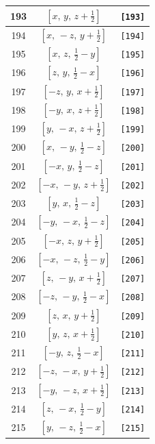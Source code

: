 \documentclass[fleqn,8pt]{jsarticle}
\begin{document}
\begin{longtable}{ccc}
193 & $\left[ x,\, y,\, z + \frac{1}{2} \right]$ & {\tt [193]} \\ \hline
194 & $\left[ x,\, - z,\, y + \frac{1}{2} \right]$ & {\tt [194]} \\ \hline
195 & $\left[ x,\, z,\, \frac{1}{2} - y \right]$ & {\tt [195]} \\ \hline
196 & $\left[ z,\, y,\, \frac{1}{2} - x \right]$ & {\tt [196]} \\ \hline
197 & $\left[ - z,\, y,\, x + \frac{1}{2} \right]$ & {\tt [197]} \\ \hline
198 & $\left[ - y,\, x,\, z + \frac{1}{2} \right]$ & {\tt [198]} \\ \hline
199 & $\left[ y,\, - x,\, z + \frac{1}{2} \right]$ & {\tt [199]} \\ \hline
200 & $\left[ x,\, - y,\, \frac{1}{2} - z \right]$ & {\tt [200]} \\ \hline
201 & $\left[ - x,\, y,\, \frac{1}{2} - z \right]$ & {\tt [201]} \\ \hline
202 & $\left[ - x,\, - y,\, z + \frac{1}{2} \right]$ & {\tt [202]} \\ \hline
203 & $\left[ y,\, x,\, \frac{1}{2} - z \right]$ & {\tt [203]} \\ \hline
204 & $\left[ - y,\, - x,\, \frac{1}{2} - z \right]$ & {\tt [204]} \\ \hline
205 & $\left[ - x,\, z,\, y + \frac{1}{2} \right]$ & {\tt [205]} \\ \hline
206 & $\left[ - x,\, - z,\, \frac{1}{2} - y \right]$ & {\tt [206]} \\ \hline
207 & $\left[ z,\, - y,\, x + \frac{1}{2} \right]$ & {\tt [207]} \\ \hline
208 & $\left[ - z,\, - y,\, \frac{1}{2} - x \right]$ & {\tt [208]} \\ \hline
209 & $\left[ z,\, x,\, y + \frac{1}{2} \right]$ & {\tt [209]} \\ \hline
210 & $\left[ y,\, z,\, x + \frac{1}{2} \right]$ & {\tt [210]} \\ \hline
211 & $\left[ - y,\, z,\, \frac{1}{2} - x \right]$ & {\tt [211]} \\ \hline
212 & $\left[ - z,\, - x,\, y + \frac{1}{2} \right]$ & {\tt [212]} \\ \hline
213 & $\left[ - y,\, - z,\, x + \frac{1}{2} \right]$ & {\tt [213]} \\ \hline
214 & $\left[ z,\, - x,\, \frac{1}{2} - y \right]$ & {\tt [214]} \\ \hline
215 & $\left[ y,\, - z,\, \frac{1}{2} - x \right]$ & {\tt [215]} \\ \hline

\end{longtable}
\end{document}

